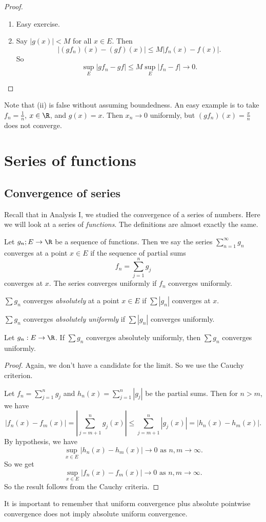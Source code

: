 \documentclass[a4paper]{article}
\begin{document}
\begin{proof}\leavevmode
  \begin{enumerate}
    \item Easy exercise.
    \item Say $|g(x)| < M$ for all $x\in E$. Then
    \[
      |(gf_n)(x) - (gf)(x)| \leq M |f_n(x) - f(x)|.
    \]
    So
    \[
      \sup_E |gf_n - gf| \leq M \sup_E |f_n - f| \to 0.
    \]
  \end{enumerate}
\end{proof}
Note that (ii) is false without assuming boundedness. An easy example is to take $f_n = \frac{1}{n}$, $x\in \R$, and $g(x) = x$. Then $x_n \to 0$ uniformly, but $(gf_n)(x) = \frac{x}{n}$ does not converge.

\section{Series of functions}
\subsection{Convergence of series}
Recall that in Analysis I, we studied the convergence of a series of numbers. Here we will look at a series of \emph{functions}. The definitions are almost exactly the same.
\begin{defi}
  Let $g_n; E \to \R$ be a sequence of functions. Then we say the series $\sum_{n = 1}^\infty g_n$ converges at a point $x \in E$ if the sequence of partial sums
  \[
    f_n = \sum_{j = 1}^ng_j
  \]
  converges at $x$. The series converges uniformly if $f_n$ converges uniformly.
\end{defi}

\begin{defi}
  $\sum g_n$ converges \emph{absolutely} at a point $x\in E$ if $\sum |g_n|$ converges at $x$.

  $\sum g_n$ converges \emph{absolutely uniformly} if $\sum |g_n|$ converges uniformly.
\end{defi}

\begin{prop}
  Let $g_n: E\to \R$. If $\sum g_n$ converges absolutely uniformly, then $\sum g_n$ converges uniformly.
\end{prop}

\begin{proof}
  Again, we don't have a candidate for the limit. So we use the Cauchy criterion.

  Let $f_n = \sum\limits_{j = 1}^n g_j$ and $h_n(x) = \sum\limits_{j = 1}^n |g_j|$ be the partial sums. Then for $n > m$, we have
  \[
    |f_n(x) - f_m(x)| = \left|\sum_{j = m + 1}^n g_j(x)\right| \leq \sum_{j = m + 1}^n |g_j(x)| = |h_n(x) - h_m(x)|.
  \]
  By hypothesis, we have
  \[
    \sup_{x\in E}|h_n(x) - h_m(x)| \to 0\text{ as }n, m\to \infty.
  \]
  So we get
  \[
    \sup_{x\in E}|f_n(x) - f_m(x)| \to 0\text{ as }n, m\to \infty.
  \]
  So the result follows from the Cauchy criteria.
\end{proof}
It is important to remember that uniform convergence plus absolute pointwise convergence does not imply absolute uniform convergence.
\end{document}

